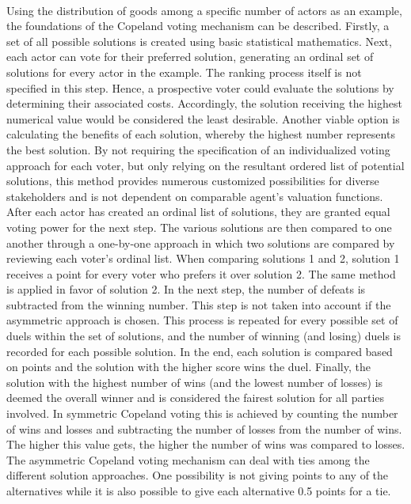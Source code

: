 \documentclass[german, a4paper, 11pt, oneside]{scrbook}
\begin{document}
\\Using the distribution of goods among a specific number of actors as an example, the foundations of the Copeland voting mechanism can be described.  Firstly, a set of all possible solutions is created using basic statistical mathematics. Next, each actor can vote for their preferred solution, generating an ordinal set of solutions for every actor in the example. The ranking process itself is not specified in this step. Hence, a prospective voter could evaluate the solutions by determining their associated costs. Accordingly, the solution receiving the highest numerical value would be considered the least desirable. Another viable option is calculating the benefits of each solution, whereby the highest number represents the best solution. By not requiring the specification of an individualized voting approach for each voter, but only relying on the resultant ordered list of potential solutions, this method provides numerous customized possibilities for diverse stakeholders and is not dependent on comparable agent's valuation functions. After each actor has created an ordinal list of solutions, they are granted equal voting power for the next step. The various solutions are then compared to one another through a one-by-one approach in which two solutions are compared by reviewing each voter's ordinal list. \cite{Bhavnani.2022b, FelixBrandtVincentConitzerUlleEndrissJeromeLangandArielD.Procaccia.} When comparing solutions 1 and 2, solution 1 receives a point for every voter who prefers it over solution 2. The same method is applied in favor of solution 2. In the next step, the number of defeats is subtracted from the winning number. This step is not taken into account if the asymmetric approach is chosen. This process is repeated for every possible set of duels within the set of solutions, and the number of winning (and losing) duels is recorded for each possible solution.  In the end, each solution is compared based on points and the solution with the higher score wins the duel. Finally, the solution with the highest number of wins (and the lowest number of losses) is deemed the overall winner and is considered the fairest solution for all parties involved. In symmetric Copeland voting this is achieved by counting the number of wins and losses and subtracting the number of losses from the number of wins. The higher this value gets, the higher the number of wins was compared to losses. \cite{Bhavnani.2022b,.2022, FelixBrandtVincentConitzerUlleEndrissJeromeLangandArielD.Procaccia.}
The asymmetric Copeland voting mechanism can deal with ties among the different solution approaches. One possibility is not giving points to any of the alternatives while it is also possible to give each alternative 0.5 points for a tie. \cite{FelixBrandtVincentConitzerUlleEndrissJeromeLangandArielD.Procaccia.}
\end{document}
